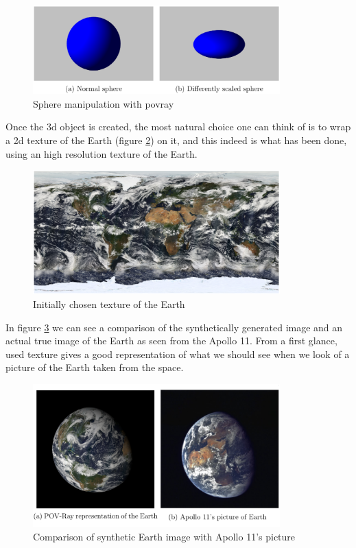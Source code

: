 \begin{figure}[htbp]
  \centering
  \includegraphics[width=0.85\textwidth]{gfx/sphere_scaling.eps}
  \caption{Sphere manipulation with \acrshort{povray} \cite{jacopo}}
  \label{fig:spherescaling}
\end{figure}

Once the \acrshort{3d} object is created, the most natural choice one can think of is to wrap a \acrshort{2d} texture of the Earth (figure \ref{fig:firstTexture}) on it, and this indeed is what has been done, using an high resolution texture of the Earth.

\begin{figure}[htbp]
  \centering
  \includegraphics[width=0.85\textwidth]{gfx/first_text.eps}
  \caption{Initially chosen texture of the Earth}
  \label{fig:firstTexture}
\end{figure}

\bigskip

In figure \ref{fig:EarthApollo} we can see a comparison of the synthetically generated image and an actual true image of the Earth as seen from the Apollo 11. From a first glance, used texture gives a good representation of what we should see when we look of a picture of the Earth taken from the space.

\begin{figure}[htbp]
  \centering
  \includegraphics[width=0.85\textwidth]{gfx/earthApolloOurs.eps}
  \caption{Comparison of synthetic Earth image with Apollo 11's picture}
  \label{fig:EarthApollo}
\end{figure}

